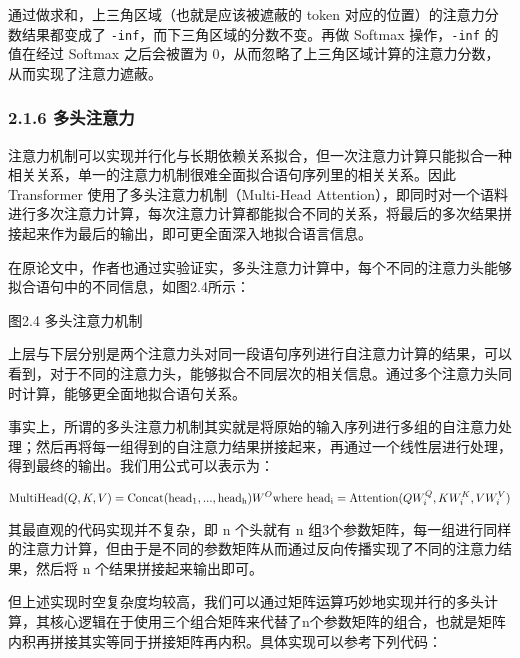 \documentclass[
]{article}
\begin{document}
通过做求和，上三角区域（也就是应该被遮蔽的 token
对应的位置）的注意力分数结果都变成了
\texttt{-inf}，而下三角区域的分数不变。再做 Softmax 操作，\texttt{-inf}
的值在经过 Softmax 之后会被置为
0，从而忽略了上三角区域计算的注意力分数，从而实现了注意力遮蔽。

\subsubsection{2.1.6 多头注意力}\label{ux591aux5934ux6ce8ux610fux529b}

注意力机制可以实现并行化与长期依赖关系拟合，但一次注意力计算只能拟合一种相关关系，单一的注意力机制很难全面拟合语句序列里的相关关系。因此
Transformer 使用了多头注意力机制（Multi-Head
Attention），即同时对一个语料进行多次注意力计算，每次注意力计算都能拟合不同的关系，将最后的多次结果拼接起来作为最后的输出，即可更全面深入地拟合语言信息。

在原论文中，作者也通过实验证实，多头注意力计算中，每个不同的注意力头能够拟合语句中的不同信息，如图2.4所示：

图2.4 多头注意力机制

\hspace{0pt}上层与下层分别是两个注意力头对同一段语句序列进行自注意力计算的结果，可以看到，对于不同的注意力头，能够拟合不同层次的相关信息。通过多个注意力头同时计算，能够更全面地拟合语句关系。

事实上，所谓的多头注意力机制其实就是将原始的输入序列进行多组的自注意力处理；然后再将每一组得到的自注意力结果拼接起来，再通过一个线性层进行处理，得到最终的输出。我们用公式可以表示为：

\[
\mathrm{MultiHead}(Q, K, V) = \mathrm{Concat}(\mathrm{head_1}, ...,
\mathrm{head_h})W^O    \\
    \text{where}~\mathrm{head_i} = \mathrm{Attention}(QW^Q_i, KW^K_i, VW^V_i)
\]

其最直观的代码实现并不复杂，即 n 个头就有 n
组3个参数矩阵，每一组进行同样的注意力计算，但由于是不同的参数矩阵从而通过反向传播实现了不同的注意力结果，然后将
n 个结果拼接起来输出即可。

但上述实现时空复杂度均较高，我们可以通过矩阵运算巧妙地实现并行的多头计算，其核心逻辑在于使用三个组合矩阵来代替了n个参数矩阵的组合，也就是矩阵内积再拼接其实等同于拼接矩阵再内积。具体实现可以参考下列代码：
\end{document}
